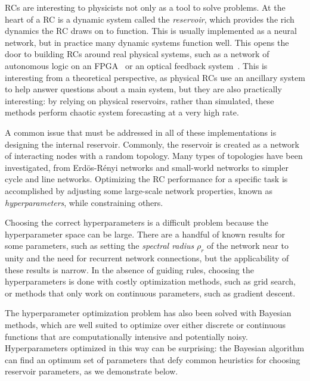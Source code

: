 RCs are interesting to physicists not only as a tool to solve
problems. At the heart of a RC is a dynamic system called the
\emph{reservoir}, which provides the rich dynamics the RC draws on to
function. This is usually implemented as a neural network, but in
practice many dynamic systems function well. This opens the door to
building RCs around real physical systems, such as a network of
autonomous logic on an FPGA~\cite{canaday2018} or an optical feedback
system~\cite{antonik2016}. This is interesting from a theoretical
perspective, as physical RCs use an ancillary system to help answer
questions about a main system, but they are also practically
interesting: by relying on physical reservoirs, rather than simulated,
these methods perform chaotic system forecasting at a very high rate.



A common issue that must be addressed in all of these implementations
is designing the internal reservoir. Commonly, the reservoir is
created as a network of interacting nodes with a random topology. Many
types of topologies have been investigated, from
Erd{\"{o}}s-R{\'{e}}nyi networks and small-world
networks\cite{haluszczynski2019} to simpler cycle and line
networks.\cite{rodan2011} Optimizing the RC performance for a specific
task is accomplished by adjusting some large-scale network properties,
known as \emph{hyperparameters}, while constraining others.

Choosing the correct hyperparameters is a difficult problem because the hyperparameter space can be large. There are a handful of known results for some
parameters, such as setting the \emph{spectral radius} $\rho_r$ of the network near to unity and the need for recurrent network connections,\cite{jaeger2001,lukosevicius2012} but the applicability of these results is narrow. In the absence of guiding rules, choosing the hyperparameters is done with costly optimization methods, such as grid search,\cite{rodan2011} or methods that only work on continuous parameters, such
as gradient descent.\cite{jaeger2007}

The hyperparameter optimization problem has also been solved with
Bayesian methods,\cite{yperman2016,maat2018} which are well suited to optimize over either discrete or continuous functions that are computationally intensive and potentially noisy. Hyperparameters
optimized in this way can be surprising: the Bayesian algorithm can
find an optimum set of parameters that defy common heuristics for
choosing reservoir parameters, as we demonstrate below.

